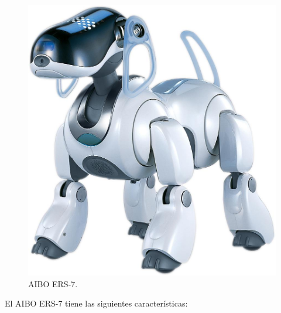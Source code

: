 \documentclass[12pt,a4paper,final,twoside]{book}
\begin{document}
\begin{figure}[h!]
	\centering
    \includegraphics[scale=0.1]	{images/ers7lrg}
	 \caption{AIBO ERS-7.}
  \label{fig:ers7}
\end{figure}	
\newpage
El AIBO ERS-7 tiene las siguientes características: 
\end{document}
